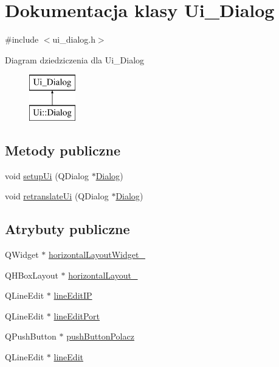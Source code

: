 \hypertarget{classUi__Dialog}{\section{Dokumentacja klasy Ui\-\_\-\-Dialog}
\label{classUi__Dialog}
}


{\ttfamily \#include $<$ui\-\_\-dialog.\-h$>$}

Diagram dziedziczenia dla Ui\-\_\-\-Dialog\begin{figure}[H]
\begin{center}
\leavevmode
\includegraphics[height=2.000000cm]{classUi__Dialog}
\end{center}
\end{figure}
\subsection*{Metody publiczne}
\begin{DoxyCompactItemize}
\item 
void \hyperlink{classUi__Dialog_a4f6a478c3ecdafabffb17b39cb26444a}{setup\-Ui} (Q\-Dialog $\ast$\hyperlink{classDialog}{Dialog})
\item 
void \hyperlink{classUi__Dialog_afa0ccb6f716ca6178260522a193c250e}{retranslate\-Ui} (Q\-Dialog $\ast$\hyperlink{classDialog}{Dialog})
\end{DoxyCompactItemize}
\subsection*{Atrybuty publiczne}
\begin{DoxyCompactItemize}
\item 
Q\-Widget $\ast$ \hyperlink{classUi__Dialog_a4a01239907c0d25e55efbe5811d64e94}{horizontal\-Layout\-Widget\-\_}
\item 
Q\-H\-Box\-Layout $\ast$ \hyperlink{classUi__Dialog_a289b49bcdd28408efe2510f029535c2b}{horizontal\-Layout\-\_}
\item 
Q\-Line\-Edit $\ast$ \hyperlink{classUi__Dialog_ab46d172e983ee875ea7d404f0e9cffeb}{line\-Edit\-I\-P}
\item 
Q\-Line\-Edit $\ast$ \hyperlink{classUi__Dialog_af72591b169533ffca5bfb1aef6771696}{line\-Edit\-Port}
\item 
Q\-Push\-Button $\ast$ \hyperlink{classUi__Dialog_a80234b371a2b143b74be0c4351ad2267}{push\-Button\-Polacz}
\item 
Q\-Line\-Edit $\ast$ \hyperlink{classUi__Dialog_a934cf16b9b36614a93f04261c652c1c7}{line\-Edit}
\end{DoxyCompactItemize}


